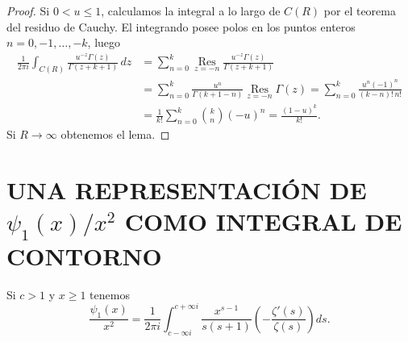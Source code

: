 \begin{proof}
        Si $0<u\leq1$, calculamos la integral a lo largo de $C(R)$ por el teorema del residuo
        de Cauchy. El integrando posee polos en los puntos enteros $n=0,-1,\dots,-k$, luego
        \begin{align*}
            \frac{1}{2\pi i}\int_{C(R)}\frac{u^{-z}\Gamma(z)}{\Gamma(z+k+1)}\,dz&=\sum_{n=0}^{k}\operatorname*{Res}_{z=-n}\frac{u^{-z}\Gamma(z)}{\Gamma(z+k+1)}\\
            &=\sum_{n=0}^{k}\frac{u^n}{\Gamma(k+1-n)}\operatorname*{Res}_{z=-n}\Gamma(z)=\sum_{n=0}^{k}\frac{u^n(-1)^n}{(k-n)!\,n!}\\
            &=\frac{1}{k!}\sum_{n=0}^{k}\binom{k}{n}(-u)^n=\frac{(1-u)^k}{k!}.
        \end{align*}
        Si $R\to\infty$ obtenemos el lema.
    \end{proof}

    \section[UNA REPRESENTACIÓN DE $\psi_1(x)/x^2$ COMO INTEGRAL DE CONTORNO]{UNA REPRESENTACIÓN DE \texorpdfstring{$\psi_1(x)/x^2$}{ψ₁(x)/x²} COMO INTEGRAL DE CONTORNO}

    \begin{teorema}\label{teo:13-2}
        Si $c>1$ y $x\geq1$ tenemos
        \begin{equation}\label{eq:13-11}
            \frac{\psi_1(x)}{x^2}=\frac{1}{2\pi i}\int_{c-\infty i}^{c+\infty i}\frac{x^{s-1}}{s(s+1)}\left(-\frac{\zeta'(s)}{\zeta(s)}\right)ds.
        \end{equation}
    \end{teorema}

